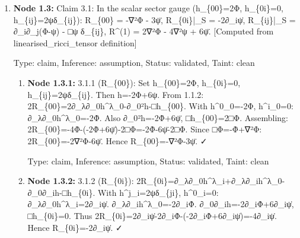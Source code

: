 \begin{enumerate}
\begin{enumerate}
\item \textbf{Node 1.2.4:} 2.1.4: In the gauge E=B=F\_i=0: Φ=φ, V\_i=S\_i, Ψ=ψ, h\textasciicircum{}\{TT\}\_\{ij\}=h\textasciicircum{}\{TT\}\_\{ij\}. [Direct substitution into 2.1.3]

  Type: claim, Inference: assumption, Status: validated, Taint: clean

\item \textbf{Node 1.2.5:} 2.1.5: The action I is constructed from R\textasciicircum{}(1)\_\{μν\} and R\textasciicircum{}(1)\}, both gauge-invariant at linear order (the linearised Riemann tensor is invariant under h\_\{μν\}→h\_\{μν\}+∂\_μξ\_ν+∂\_νξ\_μ). Therefore I expressed in Bardeen variables is gauge-independent. QED. [Ref: Gauge Invariance of Linearised Curvature]

  Type: claim, Inference: assumption, Status: validated, Taint: clean

\end{enumerate}
\item \textbf{Node 1.3:} Claim 3.1: In the scalar sector gauge (h\_\{00\}=2Φ, h\_\{0i\}=0, h\_\{ij\}=2ψδ\_\{ij\}): R\_\{00\} = -∇²Φ - 3ψ̈, R\_\{0i\}|\_S = -2∂\_iψ̇, R\_\{ij\}|\_S = ∂\_i∂\_j(Φ-ψ) - □ψ δ\_\{ij\}, R\textasciicircum{}(1) = 2∇²Φ - 4∇²ψ + 6ψ̈. [Computed from linearised\_ricci\_tensor definition]

  Type: claim, Inference: assumption, Status: validated, Taint: clean

\begin{enumerate}
\item \textbf{Node 1.3.1:} 3.1.1 (R\_\{00\}): Set h\_\{00\}=2Φ, h\_\{0i\}=0, h\_\{ij\}=2ψδ\_\{ij\}. Then h=-2Φ+6ψ. From 1.1.2: 2R\_\{00\}=2∂\_λ∂\_0h\textasciicircum{}λ\_0-∂\_0²h-□h\_\{00\}. With h\textasciicircum{}0\_0=-2Φ, h\textasciicircum{}i\_0=0: ∂\_λ∂\_0h\textasciicircum{}λ\_0=-2Φ̈. Also ∂\_0²h=-2Φ̈+6ψ̈, □h\_\{00\}=2□Φ. Assembling: 2R\_\{00\}=-4Φ̈-(-2Φ̈+6ψ̈)-2□Φ=-2Φ̈-6ψ̈-2□Φ. Since □Φ=-Φ̈+∇²Φ: 2R\_\{00\}=-2∇²Φ-6ψ̈. Hence R\_\{00\}=-∇²Φ-3ψ̈. ✓

  Type: claim, Inference: assumption, Status: validated, Taint: clean

\item \textbf{Node 1.3.2:} 3.1.2 (R\_\{0i\}): 2R\_\{0i\}=∂\_λ∂\_0h\textasciicircum{}λ\_i+∂\_λ∂\_ih\textasciicircum{}λ\_0-∂\_0∂\_ih-□h\_\{0i\}. With h\textasciicircum{}j\_i=2ψδ\_\{ji\}, h\textasciicircum{}0\_i=0: ∂\_λ∂\_0h\textasciicircum{}λ\_i=2∂\_iψ̇. ∂\_λ∂\_ih\textasciicircum{}λ\_0=-2∂\_iΦ̇. ∂\_0∂\_ih=-2∂\_iΦ̇+6∂\_iψ̇, □h\_\{0i\}=0. Thus 2R\_\{0i\}=2∂\_iψ̇-2∂\_iΦ̇-(-2∂\_iΦ̇+6∂\_iψ̇)=-4∂\_iψ̇. Hence R\_\{0i\}=-2∂\_iψ̇. ✓


\end{enumerate}
\end{enumerate}
